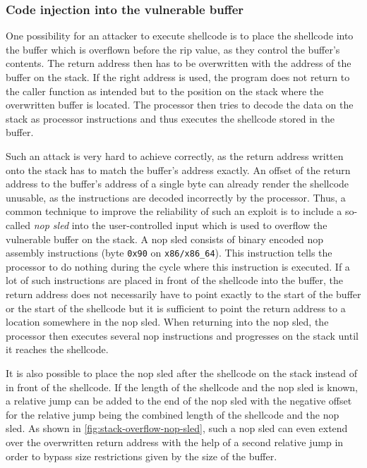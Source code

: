 \subsubsection{Code injection into the vulnerable buffer}
\label{subsubsec:ci-into-vuln-buffer}

One possibility for an attacker to execute shellcode is to place the shellcode into the buffer which is overflown before the \gls{rip} value, as they control the buffer's contents.
The return address then has to be overwritten with the address of the buffer on the stack.
If the right address is used, the program does not return to the caller function as intended but to the position on the stack where the overwritten buffer is located.
The processor then tries to decode the data on the stack as processor instructions and thus executes the shellcode stored in the buffer.

Such an attack is very hard to achieve correctly, as the return address written onto the stack has to match the buffer's address exactly.
An offset of the return address to the buffer's address of a single byte can already render the shellcode unusable, as the instructions are decoded incorrectly by the processor.
Thus, a common technique to improve the reliability of such an exploit is to include a so-called \emph{\gls{nop} sled} into the user-controlled input which is used to overflow the vulnerable buffer on the stack.
A \gls{nop} sled consists of binary encoded \acrshort{nop} assembly instructions (byte \texttt{0x90} on \texttt{x86/x86\_64}).
This instruction tells the processor to do nothing during the cycle where this instruction is executed.
If a lot of such instructions are placed in front of the shellcode into the buffer, the return address does not necessarily have to point exactly to the start of the buffer or the start of the shellcode but it is sufficient to point the return address to a location somewhere in the \acrshort{nop} sled.
When returning into the \acrshort{nop} sled, the processor then executes several \gls{nop} instructions and progresses on the stack until it reaches the shellcode.

It is also possible to place the \acrshort{nop} sled after the shellcode on the stack instead of in front of the shellcode.
If the length of the shellcode and the \acrshort{nop} sled is known, a relative jump can be added to the end of the \acrshort{nop} sled with the negative offset for the relative jump being the combined length of the shellcode and the \acrshort{nop} sled.
As shown in \cref{fig:stack-overflow-nop-sled}, such a \acrshort{nop} sled can even extend over the overwritten return address with the help of a second relative jump in order to bypass size restrictions given by the size of the buffer.

